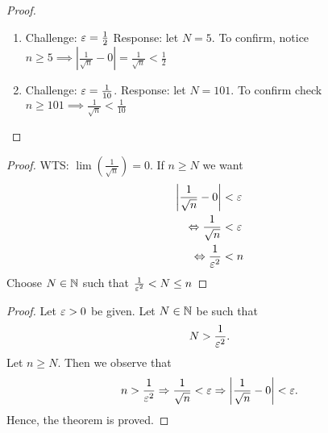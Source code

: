 \begin{proof}
	\begin{enumerate}
		\item Challenge: $\e = \frac{1}{2}$ Response: let  $N = 5$. To confirm, notice $n \ge 5 \implies \left|\frac{1}{\sqrt{n}} - 0\right| = \frac{1}{\sqrt{n} } < \frac{1}{2}$
		\item Challenge: $\e = \frac{1}{10}$. Response: let $N = 101$. To confirm check  $n \ge 101 \implies \frac{1}{\sqrt{n}} < \frac{1}{10}$ 
	\end{enumerate}
\end{proof}

\begin{proof}
	WTS: $\lim\left( \frac{1}{\sqrt{n} } \right) = 0$. If $n \ge N$ we want 
	\begin{align}
		\left|\frac{1}{\sqrt{n} } - 0\right| &< \e \\
		\iff \frac{1}{\sqrt{n}} &< \e \\
		\iff \frac{1}{\e^{2}} &< n
	\end{align}
	Choose $N \in \mathbb{N}$ such that $\frac{1}{\e^{2}} < N \le  n $
\end{proof}

\begin{proof}
	Let $\e >0$ be given. Let  $N \in \mathbb{N}$ be such that 
	 \[
		 N > \frac{1}{\e^{2}}
	.\] 
	Let $n \ge N$. Then we observe that
	\[
		n > \frac{1}{\e^{2}} \implies \frac{1}{\sqrt{n} } < \e \implies\left|\frac{1}{\sqrt{n}} - 0\right| < \e	
	.\] 
	Hence, the theorem is proved.
\end{proof}

























